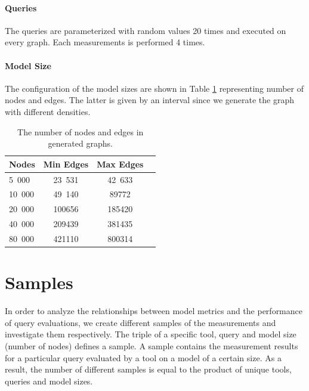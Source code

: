 \paragraph{Queries}
The queries are parameterized with random values 20 times and executed on every graph. Each measurements is performed 4 times.

\paragraph{Model Size}

The configuration of the model sizes are shown in Table \ref{tab:graph_size} representing number of nodes and edges. The latter is given by an interval since we generate the graph with different densities.

\begin{table}[ht]
	\footnotesize
	\centering
	
	\begin{tabular}{ l c c c}
		\toprule
		Nodes & Min Edges & Max Edges \\ \hline
		5~000 & 23~531 & 42~633\\ \hline
		10~000 & 49~140 & 89772\\ \hline	
		20~000 & 100656 & 185420\\ \hline
		40~000 & 209439 & 381435\\ \hline
		80~000 & 421110 & 800314\\ \hline
		\bottomrule
	\end{tabular}
	\caption{The number of nodes and edges in generated graphs.}
	\label{tab:graph_size}
\end{table}

\section{Samples}

In order to analyze the relationships between model metrics and the performance of query evaluations, we create different samples of the measurements and investigate them respectively. The triple of a specific tool, query and model size (number of nodes) defines a sample. A sample contains the measurement results for a particular query evaluated by a tool on a model of a certain size. As a result, the number of different samples is equal to the product of unique tools, queries and model sizes.

